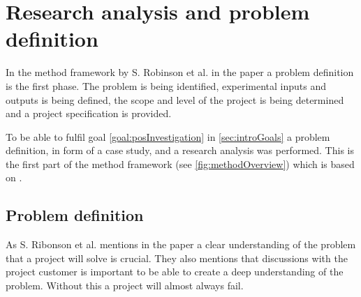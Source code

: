 \section{Research analysis and problem definition}\label{sec:methodProblemDefinition}
In the method framework by S. Robinson et al. in the paper \cite{SecretsSuccessfulSimulation1995} a problem definition is the first phase.
The problem is being identified, experimental inputs and outputs is being defined, the scope and level of the project is being determined and a project specification is provided.





\bigskip

To be able to fulfil goal \ref{goal:posInvestigation} in \cref{sec:introGoals} a problem definition, in form of a case study, and a research analysis was performed.
This is the first part of the method framework (see \cref{fig:methodOverview}) which is based on \cite{SecretsSuccessfulSimulation1995}.


\subsection{Problem definition}\label{sec:methodProblemDefinition}
As S. Ribonson et al. mentions in the paper \cite{SecretsSuccessfulSimulation1995} a clear understanding of the problem that a project will solve is crucial.
They also mentions that discussions with the project customer is important to be able to create a deep understanding of the problem.
Without this a project will almost always fail.

